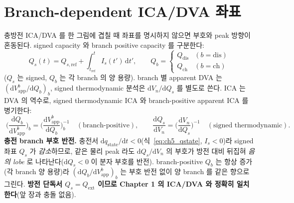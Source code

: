 \documentclass[11pt,a4paper]{article}
\newcommand{\dd}{\mathrm{d}}
\newcommand{\app}{\mathrm{app}}
\newcommand{\ext}{\mathrm{ext}}
\newcommand{\dis}{\mathrm{dis}}
\newcommand{\chg}{\mathrm{ch}}
\newcommand{\stt}{\mathrm{state}}
\begin{document}
\section{Branch-dependent ICA/DVA 좌표}\label{sec:ch5_icadva}
충방전 ICA/DVA 를 한 그림에 겹칠 때 좌표를 명시하지 않으면 부호와 peak 방향이 혼동된다. signed capacity 와
branch positive capacity 를 구분한다:
\begin{equation}
Q_s(t)=Q_{s,\mathrm{ref}}+\int_{t_{\mathrm{ref}}}^t I_s(t')\,\dd t',\qquad
Q_b=\begin{cases}Q_\dis & (b=\dis)\\ Q_\chg & (b=\chg)\end{cases}
\label{eq:ch5_signed_cap}
\end{equation}
($Q_s$ 는 signed, $Q_b$ 는 각 branch 의 양 용량). branch 별 apparent DVA 는 $(\dd V_\app^b/\dd Q_b)_b$, signed
thermodynamic 분석은 $\dd V_n/\dd Q_s$ 를 별도로 쓴다. ICA 는 DVA 의 역수로, signed thermodynamic ICA 와
branch-positive apparent ICA 를 병기한다:
\begin{equation}
\boxed{\;\Big(\frac{\dd Q_b}{\dd V_\app^b}\Big)_b=\Big(\frac{\dd V_\app^b}{\dd Q_b}\Big)_b^{-1}
\quad(\text{branch-positive}),\qquad
\frac{\dd Q_s}{\dd V_n}=\Big(\frac{\dd V_n}{\dd Q_s}\Big)^{-1}\quad(\text{signed thermodynamic}).\;}
\label{eq:ch5_branch_ica}
\end{equation}
\textbf{충전 branch 부호 반전.} 충전서 $\dd q_\stt/\dd t<0$(식~\eqref{eq:ch5_qstate}, $I_s<0$)라 signed 좌표
$Q_s$ 가 \emph{감소}하므로, 같은 물리 peak 라도 $\dd Q_s/\dd V_n$ 의 부호가 방전 대비 뒤집혀 \emph{음의 lobe} 로
나타난다($\dd Q_s<0$ 이 분자 부호를 반전). branch-positive $Q_b$ 는 항상 증가(각 branch 양 용량)라
$(\dd Q_b/\dd V_\app^b)_b$ 는 부호 반전 없이 양 branch 를 같은 향으로 그린다. \textbf{방전 단독서 $Q_s=Q_\ext$
이므로 Chapter 1 의 ICA/DVA 와 정확히 일치한다}(앞 장과 충돌 없음).

\end{document}
